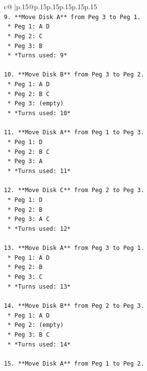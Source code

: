 \documentclass{article}
\begin{document}
{\begin{supertabular}{c@{$\;$}|p{.15\linewidth}@{}p{.15\linewidth}p{.15\linewidth}p{.15\linewidth}p{.15\linewidth}p{.15\linewidth}}
{{{\\ 
\texttt{9.  **Move Disk A** from Peg 3 to Peg 1.} \\
\texttt{    *   Peg 1: A D} \\
\texttt{    *   Peg 2: C} \\
\texttt{    *   Peg 3: B} \\
\texttt{    *   *Turns used: 9*} \\
\\ 
\texttt{10. **Move Disk B** from Peg 3 to Peg 2.} \\
\texttt{    *   Peg 1: A D} \\
\texttt{    *   Peg 2: B C} \\
\texttt{    *   Peg 3: (empty)} \\
\texttt{    *   *Turns used: 10*} \\
\\ 
\texttt{11. **Move Disk A** from Peg 1 to Peg 3.} \\
\texttt{    *   Peg 1: D} \\
\texttt{    *   Peg 2: B C} \\
\texttt{    *   Peg 3: A} \\
\texttt{    *   *Turns used: 11*} \\
\\ 
\texttt{12. **Move Disk C** from Peg 2 to Peg 3.} \\
\texttt{    *   Peg 1: D} \\
\texttt{    *   Peg 2: B} \\
\texttt{    *   Peg 3: A C} \\
\texttt{    *   *Turns used: 12*} \\
\\ 
\texttt{13. **Move Disk A** from Peg 3 to Peg 1.} \\
\texttt{    *   Peg 1: A D} \\
\texttt{    *   Peg 2: B} \\
\texttt{    *   Peg 3: C} \\
\texttt{    *   *Turns used: 13*} \\
\\ 
\texttt{14. **Move Disk B** from Peg 2 to Peg 3.} \\
\texttt{    *   Peg 1: A D} \\
\texttt{    *   Peg 2: (empty)} \\
\texttt{    *   Peg 3: B C} \\
\texttt{    *   *Turns used: 14*} \\
\\ 
\texttt{15. **Move Disk A** from Peg 1 to Peg 2.} \\
}}}
\end{supertabular}}
\end{document}
